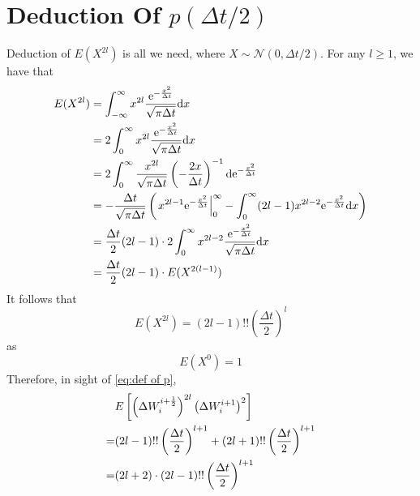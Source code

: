 \documentclass{homework}
\begin{document}
    \section[Deduction Of p(Delta t/2)]{Deduction Of $p(\Delta t/2)$}
    \label{sec:deduction of p}
    Deduction of $E(X^{2l})$ is all we need, where $X\sim\mathcal N(0,\Delta t/2)$.
    For any $l\geq 1$, we have that
    \[\begin{aligned}
        E(X^{2l})&=\int_{-\infty}^\infty
        x^{2l}\frac{\mathrm e^{-\frac{x^2}{\Delta t}}}{\sqrt{\pi\Delta t}}
        \mathrm d x\\
        &=2\int_{0}^\infty
        x^{2l}\frac{\mathrm e^{-\frac{x^2}{\Delta t}}}{\sqrt{\pi\Delta t}}
        \mathrm d x\\
        &=2\int_{0}^\infty
        \frac{x^{2l}}{\sqrt{\pi\Delta t}}
        \left(-\frac{2x}{\Delta t}\right)^{-1}
        \mathrm d \mathrm e^{-\frac{x^2}{\Delta t}}\\
        &=-\frac{\Delta t}{\sqrt{\pi\Delta t}}
        \left(\left.x^{2l-1}\mathrm e^{-\frac{x^2}{\Delta t}}\right|^\infty_0
        -\int_0^\infty(2l-1)x^{2l-2}\mathrm e^{-\frac{x^2}{\Delta t}}\mathrm d x
        \right)\\
        &=\frac{\Delta t}{2}(2l-1)\cdot
        2\int_0^\infty x^{2l-2}\frac{\mathrm e^{-\frac{x^2}{\Delta t}}}{\sqrt{\pi\Delta t}}\mathrm d x\\
        &=\frac{\Delta t}{2}(2l-1)\cdot E(X^{2(l-1)})
    \end{aligned}\]
    It follows that
    \[E(X^{2l})=(2l-1)!!\left(\frac{\Delta t}{2}\right)^l\]
    as
    \[E(X^0)=1\]
    Therefore, in sight of \cref{eq:def of p},
    \[\begin{aligned}
        &E\left[\left(\Delta W_{i}^{i+\frac{1}{2}}\right)^{2l}
        \left(\Delta W_{i}^{i+1}\right)^2\right]\\
        =&(2l-1)!!\left(\frac{\Delta t}{2}\right)^{l+1}
        +(2l+1)!!\left(\frac{\Delta t}{2}\right)^{l+1}\\
        =&(2l+2)\cdot(2l-1)!!\left(\frac{\Delta t}{2}\right)^{l+1}
    \end{aligned}\]
\end{document}
